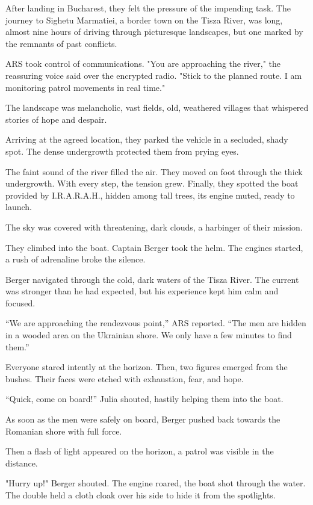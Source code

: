 \documentclass[
]{article}
\begin{document}
After landing in Bucharest, they felt the pressure of the impending task. The journey to Sighetu Marmatiei, a border town on the Tisza River, was long, almost nine hours of driving through picturesque landscapes, but one marked by the remnants of past conflicts.

ARS took control of communications. "You are approaching the river," the reassuring voice said over the encrypted radio. "Stick to the planned route. I am monitoring patrol movements in real time."

The landscape was melancholic, vast fields, old, weathered villages that whispered stories of hope and despair.

Arriving at the agreed location, they parked the vehicle in a secluded, shady spot. The dense undergrowth protected them from prying eyes.

The faint sound of the river filled the air. They moved on foot through the thick undergrowth. With every step, the tension grew. Finally, they spotted the boat provided by I.R.A.R.A.H., hidden among tall trees, its engine muted, ready to launch.

The sky was covered with threatening, dark clouds, a harbinger of their mission.

They climbed into the boat. Captain Berger took the helm. The engines started, a rush of adrenaline broke the silence.

Berger navigated through the cold, dark waters of the Tisza River. The current was stronger than he had expected, but his experience kept him calm and focused.

``We are approaching the rendezvous point,'' ARS reported. ``The men are hidden in a wooded area on the Ukrainian shore. We only have a few minutes to find them.''

Everyone stared intently at the horizon. Then, two figures emerged from the bushes. Their faces were etched with exhaustion, fear, and hope.

``Quick, come on board!'' Julia shouted, hastily helping them into the boat.

As soon as the men were safely on board, Berger pushed back towards the Romanian shore with full force.

Then a flash of light appeared on the horizon, a patrol was visible in the distance.

"Hurry up!" Berger shouted. The engine roared, the boat shot through the water. The double held a cloth cloak over his side to hide it from the spotlights.
\end{document}
